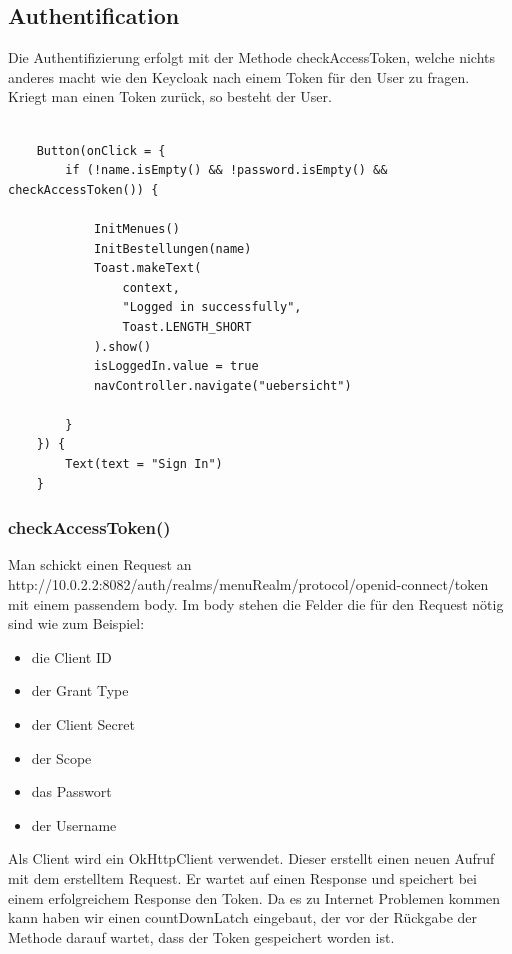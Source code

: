 \subsection{Authentification}
Die Authentifizierung erfolgt mit der Methode checkAccessToken, welche nichts anderes macht wie den Keycloak nach einem Token für den User zu fragen.
Kriegt man einen Token zurück, so besteht der User.

\begin{lstlisting}

    Button(onClick = {
        if (!name.isEmpty() && !password.isEmpty() && checkAccessToken()) {

            InitMenues()
            InitBestellungen(name)
            Toast.makeText(
                context,
                "Logged in successfully",
                Toast.LENGTH_SHORT
            ).show()
            isLoggedIn.value = true
            navController.navigate("uebersicht")

        }
    }) {
        Text(text = "Sign In")
    }

\end{lstlisting}




\subsubsection{checkAccessToken()}

Man schickt einen Request an http://10.0.2.2:8082/auth/realms/menuRealm/protocol/openid-connect/token mit einem passendem body.
Im body stehen die Felder die für den Request nötig sind wie zum Beispiel:
\begin{itemize}
    \item die Client ID
    \item der Grant Type 
    \item der Client Secret
    \item der Scope
    \item das Passwort
    \item der Username
\end{itemize}

Als Client wird ein OkHttpClient verwendet. Dieser erstellt einen neuen Aufruf mit dem erstelltem Request. 
Er wartet auf einen Response und speichert bei einem erfolgreichem Response den Token. Da es zu Internet Problemen kommen kann haben wir
einen countDownLatch eingebaut, der vor der Rückgabe der Methode darauf wartet, dass der Token gespeichert worden ist.  

